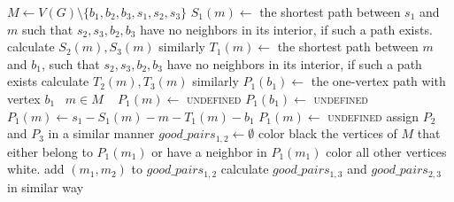 \begin{algorithmic}[1]
				\ls $M \gets V(G) \setminus \{b_1, b_2, b_3, s_1, s_2, s_3\}$
					\ls $S_1(m) \gets$ the shortest path between $s_1$ and $m$ such that
					\lsx $s_2, s_3, b_2, b_3$ have no neighbors in its interior, if such a 
					\lsx path exists.
					\ls calculate $S_2(m), S_3(m)$ similarly
					\ls $T_1(m) \gets$ the shortest path between $m$ and $b_1$, such that
					\lsx $s_2, s_3, b_2, b_3$ have no neighbors in its interior, if such a
					\lsx path exists
					\ls calculate $T_2(m), T_3(m)$ similarly
				\mEndFor
						\ls $P_1(b_1) \gets$ the one-vertex path with vertex $b_1$
						\ls \algorithmicforeach ~$m \in M$ \algorithmicdo~ $P_1(m) \gets$ \textsc{undefined}
					\mElse
						\ls $P_1(b_1) \gets $ \textsc{undefined}
								\ls $P_1(m) \gets s_1-S_1(m)-m-T_1(m)-b_1$
							\mElse
								\ls $P_1(m) \gets$ \textsc{undefined}
							\mEndIf
						\mEndFor
					\mEndIf
				\mEndFor
				\ls assign $P_2$ and $P_3$ in a similar manner
				\ls $good\_pairs_{1,2} \gets \emptyset$
				 
						\ls color black the vertices of $M$ that either belong to
						\lsx $P_1(m_1)$ or have a neighbor in $P_1(m_1)$
						\lsx color all other vertices white.
								\ls add $(m_1, m_2)$ to $good\_pairs_{1,2}$
							\mEndIf
						\mEndFor
					\mEndIf
				\mEndFor
				\ls calculate $good\_pairs_{1,3}$ and $good\_pairs_{2,3}$ in similar way
						\ls \RETURN \TRUE
					\mEndIf
				\mEndFor
			\mEndIf
		\mEndFor
	\mEndFor
	\ls \RETURN \FALSE
	\mEndProcedure
\end{algorithmic}

